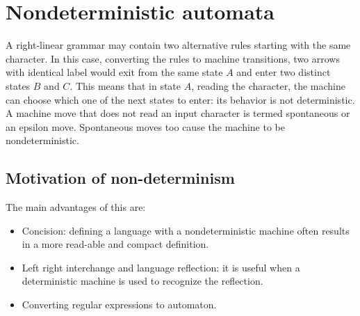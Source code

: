 \section{Nondeterministic automata}

A right-linear grammar may contain two alternative rules starting with the same character. In this case, converting the rules to machine transitions, two arrows with 
identical label would exit from the same state $A$ and enter two distinct states $B$ and $C$. This means that in state $A$, reading the character, the machine can 
choose which one of the next states to enter: its behavior is not deterministic. A machine move that does not read an input character is termed spontaneous or an epsilon 
move. Spontaneous moves too cause the machine to be nondeterministic. 

\subsection*{Motivation of non-determinism}
The main advantages of this are: 
\begin{itemize}
    \item Concision: defining a language with a nondeterministic machine often results in a more read-able and compact definition. 
    \item Left right interchange and language reflection: it is useful when a deterministic machine is used to recognize the reflection. 
    \item Converting regular expressions to automaton. 
\end{itemize}

